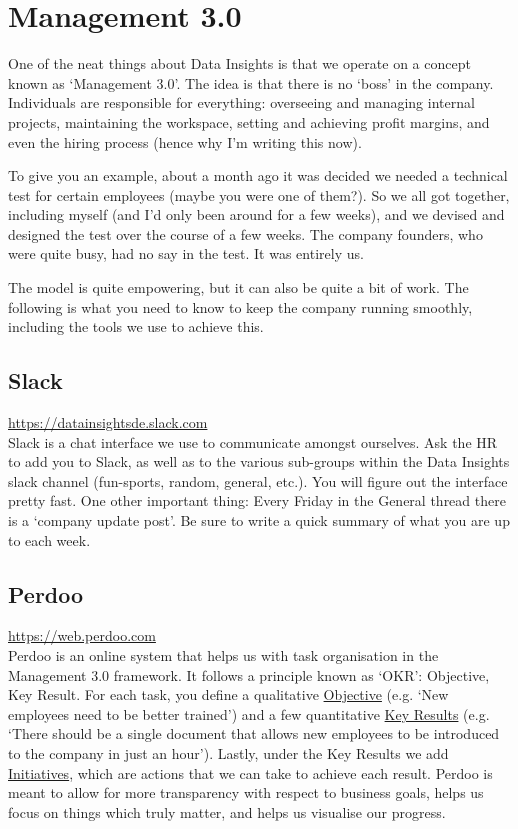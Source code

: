 \documentclass[11pt]{report}
\begin{document}
\section{Management 3.0}
One of the neat things about Data Insights is that we operate on a concept known as `Management 3.0'. The idea is that there is no `boss' in the company. Individuals are responsible for everything: overseeing and managing internal projects, maintaining the workspace, setting and achieving profit margins, and even the hiring process (hence why I'm writing this now).

To give you an example, about a month ago it was decided we needed a technical test for certain employees (maybe you were one of them?). So we all got together, including myself (and I'd only been around for a few weeks), and we devised and designed the test over the course of a few weeks. The company founders, who were quite busy, had no say in the test. It was entirely us.

The model is quite empowering, but it can also be quite a bit of work. The following is what you need to know to keep the company running smoothly, including the tools we use to achieve this.

\subsection{Slack}
\label{Slack}
\href{https://datainsightsde.slack.com}{https://datainsightsde.slack.com}\\

Slack is a chat interface we use to communicate amongst ourselves. Ask the HR to add you to Slack, as well as to the various sub-groups within the Data Insights slack channel (fun-sports, random, general, etc.). You will figure out the interface pretty fast. One other important thing: Every Friday in the General thread there is a `company update post'. Be sure to write a quick summary of what you are up to each week.

\subsection{Perdoo}
\label{Perdoo}
\href{https://web.perdoo.com}{https://web.perdoo.com}\\

Perdoo is an online system that helps us with task organisation in the Management 3.0 framework. It follows a principle known as `OKR': Objective, Key Result. For each task, you define a qualitative \underline{Objective} (e.g. `New employees need to be better trained') and a few quantitative \underline{Key Results} (e.g. `There should be a single document that allows new employees to be introduced to the company in just an hour'). Lastly, under the Key Results we add \underline{Initiatives}, which are actions that we can take to achieve each result. Perdoo is meant to allow for more transparency with respect to business goals, helps us focus on things which truly matter, and helps us visualise our progress.
\end{document}
